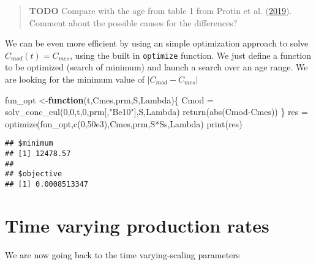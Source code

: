 \documentclass[
]{book}
\newenvironment{Shaded}{\begin{snugshade}}{\end{snugshade}}
\newcommand{\ControlFlowTok}[1]{\textcolor[rgb]{0.13,0.29,0.53}{\textbf{#1}}}
\newcommand{\DecValTok}[1]{\textcolor[rgb]{0.00,0.00,0.81}{#1}}
\newcommand{\FloatTok}[1]{\textcolor[rgb]{0.00,0.00,0.81}{#1}}
\newcommand{\FunctionTok}[1]{\textcolor[rgb]{0.00,0.00,0.00}{#1}}
\newcommand{\NormalTok}[1]{#1}
\newcommand{\OtherTok}[1]{\textcolor[rgb]{0.56,0.35,0.01}{#1}}
\newcommand{\SpecialCharTok}[1]{\textcolor[rgb]{0.00,0.00,0.00}{#1}}
\newcommand{\StringTok}[1]{\textcolor[rgb]{0.31,0.60,0.02}{#1}}
\begin{document}
\begin{quote}
\textbf{TODO} Compare with the age from table 1 from Protin et al. (\protect\hyperlink{ref-protin2019climatic}{2019}). Comment about the possible causes for the differences?
\end{quote}

We can be even more efficient by using an simple optimization approach to solve \(C_{mod}(t) = C_{mes}\), using the built in \texttt{optimize} function. We just define a function to be optimized (search of minimum) and launch a search over an age range. We are looking for the minimum value of \(|C_{mod}-C_{mes}|\)

\begin{Shaded}
\begin{Highlighting}[]
\NormalTok{fun\_opt }\OtherTok{\textless{}{-}}\ControlFlowTok{function}\NormalTok{(t,Cmes,prm,S,Lambda)\{}
\NormalTok{  Cmod }\OtherTok{=} \FunctionTok{solv\_conc\_eul}\NormalTok{(}\DecValTok{0}\NormalTok{,}\DecValTok{0}\NormalTok{,t,}\DecValTok{0}\NormalTok{,prm[,}\StringTok{"Be10"}\NormalTok{],S,Lambda)}
  \FunctionTok{return}\NormalTok{(}\FunctionTok{abs}\NormalTok{(Cmod}\SpecialCharTok{{-}}\NormalTok{Cmes))}
\NormalTok{\}}
\NormalTok{res }\OtherTok{=} \FunctionTok{optimize}\NormalTok{(fun\_opt,}\FunctionTok{c}\NormalTok{(}\DecValTok{0}\NormalTok{,}\FloatTok{50e3}\NormalTok{),Cmes,prm,S}\SpecialCharTok{*}\NormalTok{Ss,Lambda)}
\FunctionTok{print}\NormalTok{(res)}
\end{Highlighting}
\end{Shaded}

\begin{verbatim}
## $minimum
## [1] 12478.57
## 
## $objective
## [1] 0.0008513347
\end{verbatim}

\hypertarget{time-varying-production-rates}{%
\section{Time varying production rates}\label{time-varying-production-rates}}

We are now going back to the time varying-scaling parameters
\end{document}
